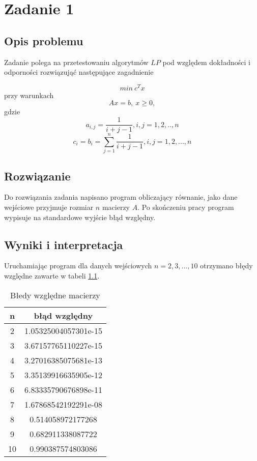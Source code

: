 \chapter{Zadanie 1}
\thispagestyle{chapterBeginStyle}
\label{rozdzial1}

\section{Opis problemu}
Zadanie polega na przetestowaniu algorytmów $LP$ pod względem dokładności i odporności
 rozwiązująć następujące zagadnienie

    $$min \ c^T x$$
przy warunkach
    $$Ax=b, \ x \geq 0,$$
gdzie
 $$a_{i,j} = \frac{1}{i+j-1}, i,j = 1,2,..,n$$
 $$c_{i}=b_{i}=\sum^{n}_{j=1} \frac{1}{i+j-1}, i,j=1,2,...,n$$

 \section{Rozwiązanie}
 Do rozwiązania zadania napisano program obliczający równanie, jako dane wejściowe przyjmuje
rozmiar $n$ macierzy $A$. Po skończeniu pracy program wypisuje na standardowe wyjście błąd względny. 

\section{Wyniki i interpretacja}

Uruchamiając program dla danych wejściowych $n = 2,3,...,10$ otrzymano błędy względne zawarte w tabeli \ref{tabela_zad1}.

\begin{table}[ht]
    \begin{center}
        \begin{tabular}{|c | c|} 
            \hline
            \rowcolor{lgray}
            n & błąd względny \\ [0.5ex] 
            \hline
            2 & 1.05325004057301e-15  \\ 
            \hline
            3 & 3.67157765110227e-15 \\
            \hline
            4 & 3.27016385075681e-13 \\
            \hline
            5 & 3.35139916635905e-12 \\
            \hline
            6 & 6.83335790676898e-11 \\
            \hline
            7 & 1.67868542192291e-08 \\
            \hline
            8 & 0.514058972177268 \\
            \hline
            9 & 0.682911338087722 \\
            \hline
            10 & 0.990387574803086 \\
            \hline
        \end{tabular}
        \caption{Błedy względne macierzy}
        \label{tabela_zad1}
    \end{center}
\end{table}

